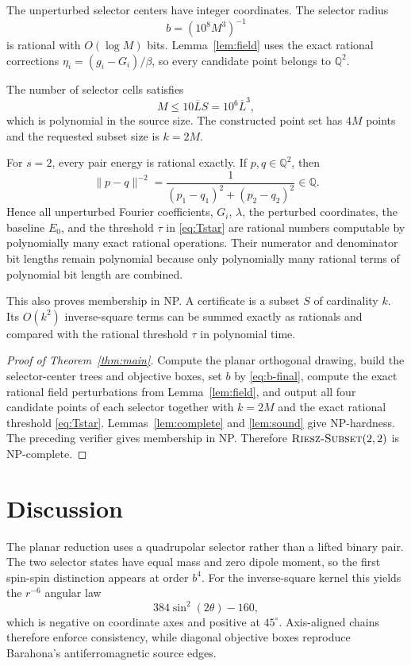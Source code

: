 \documentclass[12pt,a4paper]{article}
\newcommand{\Q}{\mathbb{Q}}
\newcommand{\norm}[1]{\lVert #1\rVert}
\newcommand{\RSSP}{\text{\normalfont\scshape Riesz-Subset}}
\begin{document}
The unperturbed selector centers have integer coordinates.  The selector radius
\[
 b=(10^8M^3)^{-1}
\]
is rational with $O(\log M)$ bits.  Lemma~\ref{lem:field} uses the exact rational corrections $\eta_i=(g_i-G_i)/\beta$, so every candidate point belongs to $\Q^2$.

The number of selector cells satisfies
\[
 M\le10\overline L S=10^6\overline L^3,
\]
which is polynomial in the source size.  The constructed point set has $4M$ points and the requested subset size is $k=2M$.

For $s=2$, every pair energy is rational exactly.  If $p,q\in\Q^2$, then
\[
 \norm{p-q}^{-2}
 =\frac1{(p_1-q_1)^2+(p_2-q_2)^2}\in\Q.
\]
Hence all unperturbed Fourier coefficients, $G_i$, $\lambda$, the perturbed coordinates, the baseline $E_0$, and the threshold $\tau$ in \eqref{eq:Tstar} are rational numbers computable by polynomially many exact rational operations.  Their numerator and denominator bit lengths remain polynomial because only polynomially many rational terms of polynomial bit length are combined.

This also proves membership in NP.  A certificate is a subset $S$ of cardinality $k$.  Its $O(k^2)$ inverse-square terms can be summed exactly as rationals and compared with the rational threshold $\tau$ in polynomial time.

\begin{proof}[Proof of Theorem~\ref{thm:main}]
Compute the planar orthogonal drawing, build the selector-center trees and objective boxes, set $b$ by \eqref{eq:b-final}, compute the exact rational field perturbations from Lemma~\ref{lem:field}, and output all four candidate points of each selector together with $k=2M$ and the exact rational threshold \eqref{eq:Tstar}.  Lemmas~\ref{lem:complete} and \ref{lem:sound} give NP-hardness.  The preceding verifier gives membership in NP.  Therefore $\RSSP(2,2)$ is NP-complete.
\end{proof}

\section{Discussion}\label{sec:discussion}

The planar reduction uses a quadrupolar selector rather than a lifted binary pair.  The two selector states have equal mass and zero dipole moment, so the first spin-spin distinction appears at order $b^4$.  For the inverse-square kernel this yields the $r^{-6}$ angular law
\[
 384\sin^2(2\theta)-160,
\]
which is negative on coordinate axes and positive at $45^\circ$.  Axis-aligned chains therefore enforce consistency, while diagonal objective boxes reproduce Barahona's antiferromagnetic source edges.
\end{document}
